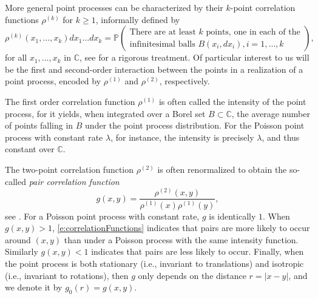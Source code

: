 More general point processes can be characterized by their $k$-point correlation functions
$\rho^{(k)}$ for $k\geq 1$, informally defined by
\begin{equation}
\rho^{(k)}(x_1,\dots,x_k)dx_1\dots dx_k = \mathbb{P}\begin{pmatrix}\text{There are at least $k$ points, one in each of the}\\
\text{infinitesimal balls $B(x_i, dx_i), i=1,\dots,k$}\end{pmatrix},
\label{e:correlationFunctions}
\end{equation}
for all $x_1,\dots,x_k$ in $\mathbb{C}$, see \cite[Section 5.4]{DaVe03} for a
rigorous treatment. Of particular interest to us will be the first and
second-order interaction between the points in a realization of a point process,
encoded by $\rho^{(1)}$ and $\rho^{(2)}$, respectively.

The first order correlation function $\rho^{(1)}$ is often called the intensity of the point process, for it yields, when
integrated over a Borel set $B\subset \mathbb{C}$, the average number of points
falling in $B$ under the point process distribution. For the Poisson point
process with constant rate $\lambda$, for instance, the intensity is precisely
$\lambda$, and thus constant over $\mathbb{C}$. 

The two-point correlation function $\rho^{(2)}$ is often renormalized to obtain
the so-called \emph{pair correlation function} $$ g(x,y) =
\frac{\rho^{(2)}(x,y)}{\rho^{(1)}(x)\rho^{(1)}(y)},$$ see \cite[Chapter
4]{MoWa03}. For a Poisson point process with constant rate, $g$ is
identically $1$. When $g(x,y)>1$, \eqref{e:correlationFunctions} indicates that
pairs are more likely to occur around $(x,y)$ than under a Poisson process with the same intensity
function. Similarly $g(x,y)<1$ indicates that pairs are less likely
to occur. Finally, when the point process is both stationary (i.e., invariant
to translations) and isotropic (i.e., invariant to rotations), then $g$ only
depends on the distance $r=\vert x-y\vert$, and we denote it by $g_0(r)=g(x,y)$.

